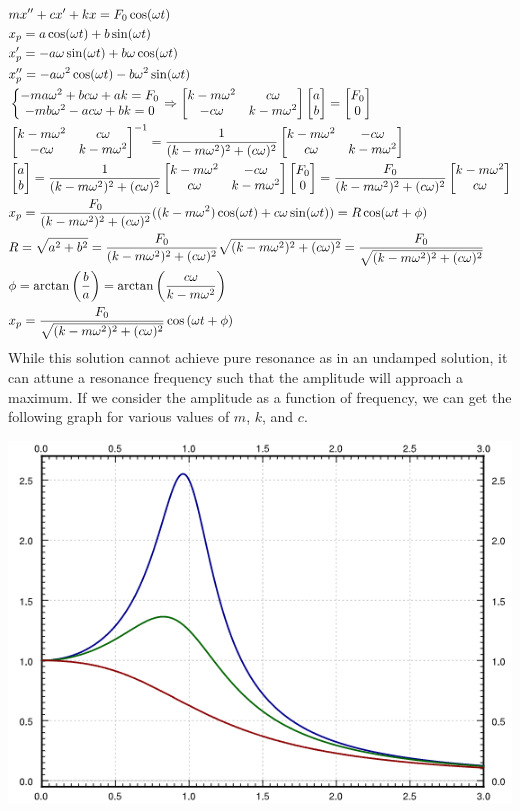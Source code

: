 \documentclass[11pt, fleqn]{article}
\begin{document}
\begin{align*}
    &mx''+cx'+kx=F_0\cos(\omega t)\\
    &x_p=a\cos(\omega t)+b\sin(\omega t)\\
    &x_p'=-a\omega\sin(\omega t)+b\omega\cos(\omega t)\\
    &x_p''=-a\omega^2\cos(\omega t)-b\omega^2\sin(\omega t)\\
    &\eqnsystem{-ma\omega^2+bc\omega+ak=F_0\\-mb\omega^2-ac\omega+bk=0}\Ra\matrixx{k-m\omega^2 & c\omega\\-c\omega & k-m\omega^2}\matrixx{a\\b}=\matrixx{F_0\\0}\\
    &\matrixx{k-m\omega^2 & c\omega\\-c\omega & k-m\omega^2}^{-1}=\frac{1}{(k-m\omega^2)^2+(c\omega)^2}\matrixx{k-m\omega^2 & -c\omega\\c\omega & k-m\omega^2}\\
    &\matrixx{a\\b}=\frac{1}{(k-m\omega^2)^2+(c\omega)^2}\matrixx{k-m\omega^2 & -c\omega\\c\omega & k-m\omega^2}\matrixx{F_0\\0}=\frac{F_0}{(k-m\omega^2)^2+(c\omega)^2}\matrixx{k-m\omega^2\\c\omega}\\
    &x_p=\frac{F_0}{(k-m\omega^2)^2+(c\omega)^2}((k-m\omega^2)\cos(\omega t)+c\omega\sin(\omega t))=R\cos(\omega t+\phi)\\
    &R=\sqrt{a^2+b^2}=\frac{F_0}{(k-m\omega^2)^2+(c\omega)^2}\sqrt{(k-m\omega^2)^2+(c\omega)^2}=\frac{F_0}{\sqrt{(k-m\omega^2)^2+(c\omega)^2}}\\
    &\phi=\arctan\brround{\frac{b}{a}}=\arctan\brround{\frac{c\omega}{k-m\omega^2}}\\
    &x_p=\frac{F_0}{\sqrt{(k-m\omega^2)^2+(c\omega)^2}}\cos\brround{\omega t+\phi}
\end{align*}
While this solution cannot achieve pure resonance as in an undamped solution, it can attune a resonance frequency such that the amplitude will approach a maximum. If we consider the amplitude as a function of frequency, we can get the following graph for various values of $m$, $k$, and $c$.\\
\centerline{\includegraphics[scale=0.8]{ODEPictures/steadyStateAmplitude.png}}
\end{document}
